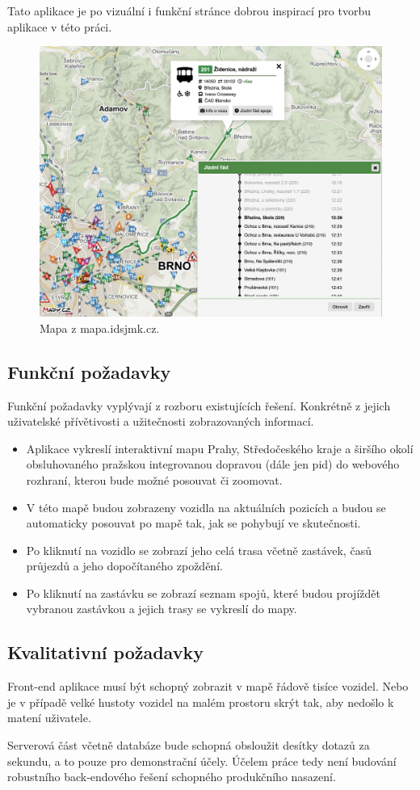 \bigbreak

Tato aplikace je po vizuální i funkční stránce dobrou inspirací pro tvorbu aplikace v této práci.

\begin{figure}
	\centering
  \includegraphics[width=0.5\linewidth]{../img/idsjmk_mapa.png}
  \caption{Mapa z mapa.idsjmk.cz.}
  \label{fig:idsjmk_result}
\end{figure}

\subsection{Funkční požadavky}


Funkční požadavky vyplývají z rozboru existujících řešení. Konkrétně z jejich uživatelské přívětivosti a užitečnosti zobrazovaných informací.


\begin{itemize}


\item Aplikace vykreslí interaktivní mapu Prahy, Středočeského kraje a širšího okolí obsluhovaného pražskou integrovanou dopravou (dále jen \gls{pid}) do webového rozhraní, kterou bude možné posouvat či zoomovat.


\item V této mapě budou zobrazeny vozidla na aktuálních pozicích a budou se automaticky posouvat po mapě tak, jak se pohybují ve skutečnosti.


\item Po kliknutí na vozidlo se zobrazí jeho celá trasa včetně zastávek, časů průjezdů a jeho dopočítaného zpoždění.


\item Po kliknutí na zastávku se zobrazí seznam spojů, které budou projíždět vybranou zastávkou a jejich trasy se vykreslí do mapy.


\end{itemize}


\subsection{Kvalitativní požadavky}


Front-end aplikace musí být schopný zobrazit v mapě řádově tisíce vozidel. Nebo je v případě velké hustoty vozidel na malém prostoru skrýt tak, aby nedošlo k matení uživatele.


\bigbreak


Serverová část včetně databáze bude schopná obsloužit desítky dotazů za sekundu, a to pouze pro demonstrační účely. Účelem práce tedy není budování robustního back-endového řešení schopného produkčního nasazení.
